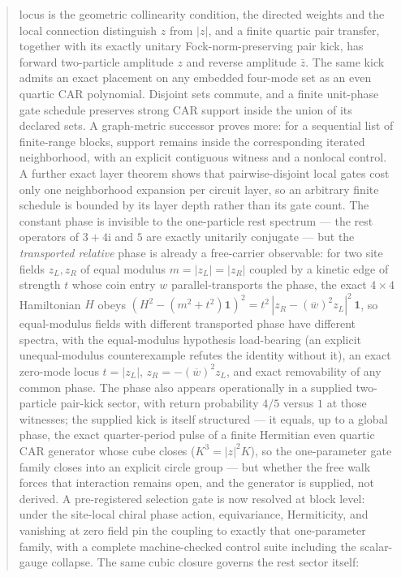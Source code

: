 \documentclass[11pt]{article}
\newcommand{\ii}{\mathrm{i}}
\newcommand{\id}{\mathbf{1}}
\begin{document}
\begin{abstract}
locus is the geometric collinearity condition, the directed weights and the
local connection distinguish $z$ from $|z|$, and a finite quartic pair
transfer, together with its exactly unitary Fock-norm-preserving pair kick,
has forward two-particle amplitude $z$ and reverse amplitude $\bar z$.  The
same kick admits an exact placement on any embedded four-mode set as an even
quartic CAR polynomial.  Disjoint sets commute, and a finite unit-phase gate
schedule preserves strong CAR support inside the union of its declared sets.
A graph-metric successor proves more: for a sequential list of finite-range
blocks, support remains inside the corresponding iterated neighborhood, with
an explicit contiguous witness and a nonlocal control.  A further exact
layer theorem shows that pairwise-disjoint local gates cost only one
neighborhood expansion per circuit layer, so an arbitrary finite schedule is
bounded by its layer depth rather than its gate count.  The
constant phase is invisible to the one-particle rest spectrum --- the rest
operators of $3+4\ii$ and $5$ are exactly unitarily conjugate --- but the
\emph{transported relative} phase is already a free-carrier observable: for
two site fields $z_L,z_R$ of equal modulus $m=|z_L|=|z_R|$ coupled by a
kinetic edge of strength $t$ whose coin entry $w$ parallel-transports the
phase, the exact $4\times4$ Hamiltonian $H$ obeys
$(H^2-(m^2+t^2)\id)^2=t^2\,|z_R-(\overline w)^2z_L|^2\,\id$, so
equal-modulus fields with different transported phase have different
spectra, with the equal-modulus hypothesis load-bearing (an explicit
unequal-modulus counterexample refutes the identity without it), an exact
zero-mode locus $t=|z_L|$, $z_R=-(\overline w)^2z_L$, and exact removability
of any common phase.  The phase also appears operationally in a supplied
two-particle pair-kick sector, with return probability $4/5$ versus $1$ at
those witnesses; the supplied kick is itself structured --- it equals, up
to a global phase, the exact quarter-period pulse of a finite Hermitian
even quartic CAR generator whose cube closes ($K^3=|z|^2K$), so the
one-parameter gate family closes into an explicit circle group --- but whether the free
walk forces that interaction remains open, and the generator is supplied,
not derived.  A pre-registered selection gate is now resolved at block
level: under the site-local chiral phase action, equivariance,
Hermiticity, and vanishing at zero field pin the coupling to exactly
that one-parameter family, with a complete machine-checked control
suite including the scalar-gauge collapse.  The same cubic closure governs the rest sector itself:

\end{abstract}
\end{document}
